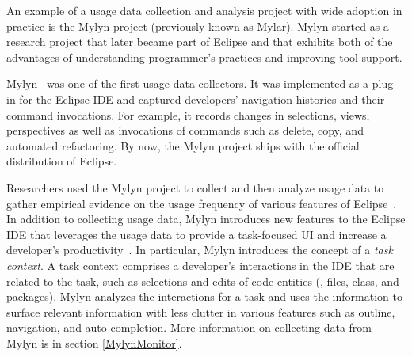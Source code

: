 
An example of a usage data collection and analysis project with wide adoption
in practice is the Mylyn project (previously known as Mylar). Mylyn started as a research project that later became part of Eclipse and that exhibits both of the advantages of understanding programmer's practices and improving tool support.

Mylyn~\cite{V:Murphy2006How} was one of the first usage data collectors. It was
implemented as a plug-in for the Eclipse IDE and captured developers' navigation
histories and their command invocations. For example, it records changes in
selections, views, perspectives as well as invocations of commands such as
delete, copy, and automated refactoring. By now, the Mylyn project ships with the official distribution of Eclipse.

Researchers used the Mylyn project to collect and then analyze usage data to gather empirical evidence on the usage frequency of various features of Eclipse~\cite{V:Murphy2006How}. In addition to collecting usage data, Mylyn introduces new features to the Eclipse
IDE that leverages the usage data to provide a task-focused UI and increase a developer's productivity~\cite{Kersten-Mylin}. In particular, Mylyn introduces the concept of a \emph{task context}. A task context comprises a developer's interactions in the IDE that are related to the task, such as selections and edits of code entities (\eg, files, class, and packages). Mylyn analyzes the interactions for a task and uses the information to surface relevant information with less clutter in various features such as outline, navigation, and auto-completion.  More information on collecting data from Mylyn is in section \ref{MylynMonitor}.

%



